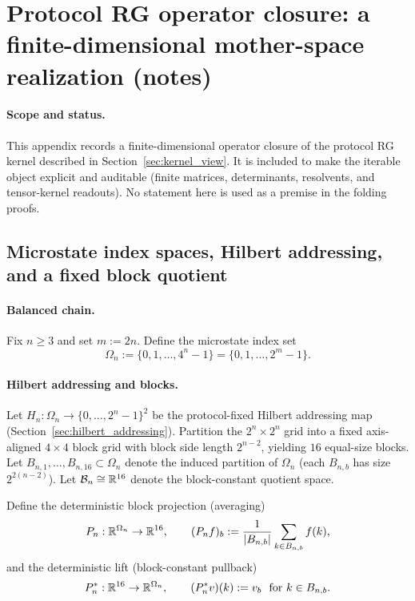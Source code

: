 \section{Protocol RG operator closure: a finite-dimensional mother-space realization (notes)}
\label{app:protocol_rg_operator_closure}

\paragraph{Scope and status.}
\AuditTag This appendix records a finite-dimensional operator closure of the protocol RG kernel described in Section~\ref{sec:kernel_view}.
It is included to make the iterable object explicit and auditable (finite matrices, determinants, resolvents, and tensor-kernel readouts).
No statement here is used as a premise in the folding proofs.

\subsection{Microstate index spaces, Hilbert addressing, and a fixed block quotient}
\label{subsec:rg_operator_micro_blocks}

\paragraph{Balanced chain.}
\MathTag Fix $n\ge 3$ and set $m:=2n$.
Define the microstate index set
\[
\Omega_n:=\{0,1,\dots,4^n-1\}=\{0,1,\dots,2^m-1\}.
\]

\paragraph{Hilbert addressing and blocks.}
\MathTag Let $H_n:\Omega_n\to\{0,\dots,2^n-1\}^2$ be the protocol-fixed Hilbert addressing map (Section~\ref{sec:hilbert_addressing}).
Partition the $2^n\times 2^n$ grid into a fixed axis-aligned $4\times 4$ block grid with block side length $2^{n-2}$, yielding $16$ equal-size blocks.
Let $B_{n,1},\dots,B_{n,16}\subset\Omega_n$ denote the induced partition of $\Omega_n$ (each $B_{n,b}$ has size $2^{2(n-2)}$).
Let $\mathcal{B}_n\cong\mathbb{R}^{16}$ denote the block-constant quotient space.

\begin{definition}\label{def:block_projection_and_lift}
\MathTag Define the deterministic block projection (averaging)
\[
P_n:\mathbb{R}^{\Omega_n}\to\mathbb{R}^{16},
\qquad
(P_nf)_b:=\frac{1}{|B_{n,b}|}\sum_{k\in B_{n,b}} f(k),
\]
and the deterministic lift (block-constant pullback)
\[
P_n^\ast:\mathbb{R}^{16}\to\mathbb{R}^{\Omega_n},
\qquad
(P_n^\ast v)(k):=v_b\ \ \text{for}\ k\in B_{n,b}.
\]
\end{definition}

